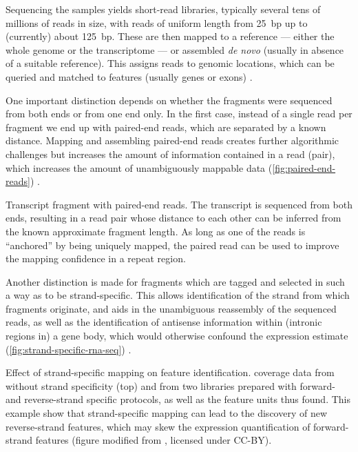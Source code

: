 Sequencing the \rnaseq samples yields short-read libraries, typically several
tens of millions of reads in size, with reads of uniform length from \SI{25}{bp}
up to (currently) about \SI{125}{bp}. These are then mapped to a reference ---
either the whole genome or the transcriptome --- or assembled \emph{de novo}
(usually in absence of a suitable reference). This assigns reads to genomic
locations, which can be queried and matched to features (usually genes or
exons) \citep{Cox:2007,Kim:2013,Anders:2014}.

One important distinction depends on whether the \cdna fragments were sequenced
from both ends or from one end only. In the first case, instead of a single read
per fragment we end up with paired-end reads, which are separated by a known
distance. Mapping and assembling paired-end reads creates further algorithmic
challenges but increases the amount of information contained in a read (pair),
which increases the amount of unambiguously mappable data
(\cref{fig:paired-end-reads}) \citep{Langmead:2012}.

    {Transcript fragment with paired-end reads.}
    {The transcript is sequenced from both ends, resulting in a read pair whose
    distance to each other can be inferred from the known approximate fragment
    length. As long as one of the reads is “anchored” by being uniquely mapped,
    the paired read can be used to improve the mapping confidence in a repeat
    region.}

Another distinction is made for fragments which are tagged and selected in such
a way as to be strand-specific. This allows identification of the strand from
which fragments originate, and aids in the unambiguous reassembly of the
sequenced reads, as well as the identification of antisense information within
(intronic regions in) a gene body, which would otherwise confound the expression
estimate (\cref{fig:strand-specific-rna-seq}) \citep{Yassour:2010}.

    {Effect of strand-specific mapping on feature identification.}
    {\rnaseq coverage data from  without strand specificity (top)
    and from two libraries prepared with forward- and reverse-strand specific
    protocols, as well as the feature units thus found. This example show that
    strand-specific mapping can lead to the discovery of new reverse-strand
    features, which may skew the expression quantification of forward-strand
    features (figure modified from \citet{Yassour:2010}, licensed under CC-BY).}


